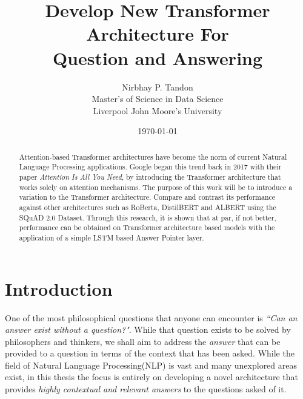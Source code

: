 \documentclass[a4paper,12pt]{report}
\begin{document}
    \title{Develop New Transformer Architecture For \\ Question and Answering}

    \author{Nirbhay P. Tandon\\ Master's of Science in Data Science\\Liverpool John Moore's University}

    \date{\vfill \monthyeardate\today}
    \maketitle


    \cleardoublepage%
    \tableofcontents
    \newpage
    \listoffigures
    \listoftables
    
    \printnomenclature[1in]
	\begin{abstract}
		Attention-based Transformer architectures have become the norm of current Natural Language Processing applications. Google began this trend back in 2017 with their paper \textit{Attention Is All You Need}, by introducing the Transformer architecture that works solely on attention mechanisms. The purpose of this work will be to introduce a variation to the Transformer architecture. Compare and contrast its performance against other architectures such as RoBerta, DistilBERT and ALBERT using the SQuAD 2.0 Dataset. Through this research, it is shown that at par, if not better, performance can be obtained on Transformer architecture based models with the application of a simple LSTM based Answer Pointer layer.

	\end{abstract}
    \cleardoublepage%
    \chapter{Introduction}\label{c1introduction}

    One of the most philosophical questions that anyone can encounter is \textit{``Can an answer exist without a question?"}. While that question exists to be solved by philosophers and thinkers, we shall aim to address the \textit{answer} that can be provided to a question in terms of the context that has been asked. While the field of Natural Language Processing(NLP) is vast and many unexplored areas exist, in this thesis the focus is entirely on developing a novel architecture that provides \textit{highly contextual and relevant answers} to the questions asked of it.
\end{document}
